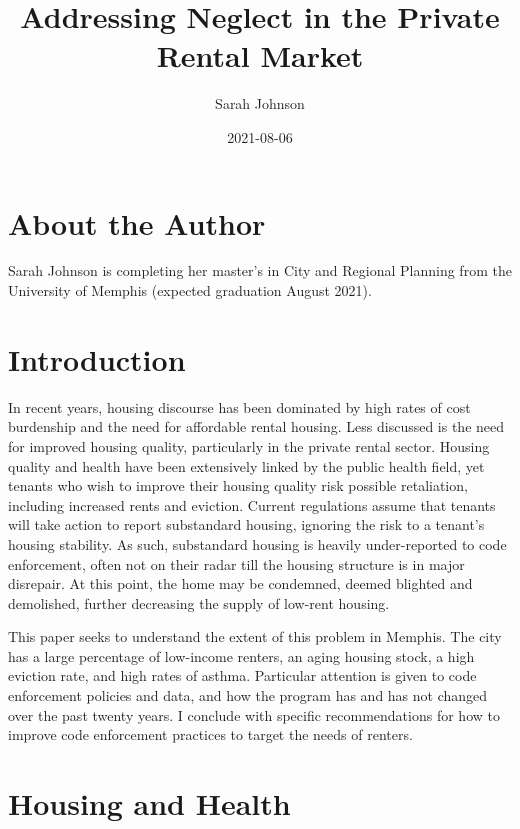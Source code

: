 \documentclass[
  openany]{book}
\title{Addressing Neglect in the Private Rental Market}
\author{Sarah Johnson}
\date{2021-08-06}
\begin{document}
\maketitle

{
\setcounter{tocdepth}{1}
\tableofcontents
}
\hypertarget{about-the-author}{%
\chapter*{About the Author}\label{about-the-author}}

Sarah Johnson is completing her master's in City and Regional Planning from the University of Memphis (expected graduation August 2021).

\hypertarget{intro}{%
\chapter{Introduction}\label{intro}}

In recent years, housing discourse has been dominated by high rates of cost burdenship and the need for affordable rental housing. Less discussed is the need for improved housing quality, particularly in the private rental sector. Housing quality and health have been extensively linked by the public health field, yet tenants who wish to improve their housing quality risk possible retaliation, including increased rents and eviction. Current regulations assume that tenants will take action to report substandard housing, ignoring the risk to a tenant's housing stability. As such, substandard housing is heavily under-reported to code enforcement, often not on their radar till the housing structure is in major disrepair. At this point, the home may be condemned, deemed blighted and demolished, further decreasing the supply of low-rent housing.

This paper seeks to understand the extent of this problem in Memphis. The city has a large percentage of low-income renters, an aging housing stock, a high eviction rate, and high rates of asthma. Particular attention is given to code enforcement policies and data, and how the program has and has not changed over the past twenty years. I conclude with specific recommendations for how to improve code enforcement practices to target the needs of renters.

\hypertarget{housing-and-health}{%
\chapter{Housing and Health}\label{housing-and-health}}
\end{document}
